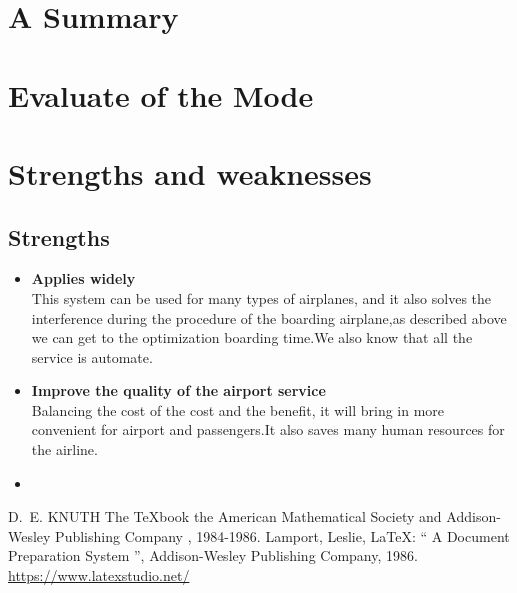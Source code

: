\documentclass{mcmthesis}
\begin{document}
\section{A Summary}
\lipsum[6]

\section{Evaluate of the Mode}

\section{Strengths and weaknesses}
\lipsum[12]

\subsection{Strengths}
\begin{itemize}
\item \textbf{Applies widely}\\
This  system can be used for many types of airplanes, and it also
solves the interference during  the procedure of the boarding
airplane,as described above we can get to the  optimization
boarding time.We also know that all the service is automate.
\item \textbf{Improve the quality of the airport service}\\
Balancing the cost of the cost and the benefit, it will bring in
more convenient  for airport and passengers.It also saves many
human resources for the airline. \item \textbf{}
\end{itemize}

\begin{thebibliography}{99}
 D.~E. KNUTH   The \TeX{}book  the American
Mathematical Society and Addison-Wesley
Publishing Company , 1984-1986.
Lamport, Leslie,  \LaTeX{}: `` A Document Preparation System '',
Addison-Wesley Publishing Company, 1986.
\url{https://www.latexstudio.net/}
\end{thebibliography}
\end{document}
